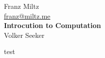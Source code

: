 \documentclass{article}
\begin{document}
\begin{titlepage}
    \begin{center}        
        \LARGE Franz Miltz\\
        
        \url{franz@miltz.me}\\
        \vspace{5cm}
        \LARGE\textbf{Introcution to Computation}\\
        \vspace{1cm}
        Volker Seeker
    \end{center}
\end{titlepage}
\tableofcontents
test
\pagebreak
\end{document}
